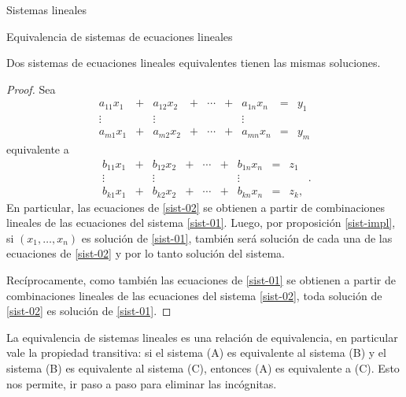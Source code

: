 \begin{chapter}{Sistemas lineales}
\begin{section}{Equivalencia de sistemas de ecuaciones lineales}
            
            \begin{teorema}\label{sistemas-equiv}
                Dos sistemas de ecuaciones lineales equivalentes tienen las mismas soluciones.
            \end{teorema}
            \begin{proof}
                Sea 
                \begin{equation}\label{sist-01} \tag{*}
                \begin{matrix}
                a_{11}x_1& + &a_{12}x_2& + &\cdots& + &a_{1n}x_n &= &y_1\\
                \vdots&  &\vdots& &&  &\vdots \\
                a_{m1}x_1& + &a_{m2}x_2& + &\cdots& + &a_{mn}x_n &=&y_m
                \end{matrix}
                \end{equation}
                equivalente a
                \begin{equation}\label{sist-02} \tag{**}
                \begin{matrix}
                b_{11}x_1& + &b_{12}x_2& + &\cdots& + &b_{1n}x_n &= &z_1\\
                \vdots&  &\vdots& &&  &\vdots \\
                b_{k1}x_1& + &b_{k2}x_2& + &\cdots& + &b_{kn}x_n &=&z_k,
                \end{matrix}.
                \end{equation}
                En particular, las ecuaciones  de \eqref{sist-02} se obtienen a partir de combinaciones  lineales de las ecuaciones del sistema  \eqref{sist-01}. Luego, por proposición \ref{sist-impl}, si  $(x_1,\ldots,x_n)$  es solución de  \eqref{sist-01}, también será solución de cada una de las ecuaciones de \eqref{sist-02} y por lo tanto solución  del sistema. 
                
                Recíprocamente, como también las ecuaciones  de \eqref{sist-01} se obtienen a partir de     combinaciones lineales de las ecuaciones del sistema  \eqref{sist-02}, toda solución  de    \eqref{sist-02} es solución de   \eqref{sist-01}.
            \end{proof}
            

            \begin{observacion*}
                La equivalencia de sistemas lineales es una relación de equivalencia,  en particular  vale la propiedad transitiva: si el sistema (A) es equivalente al sistema (B) y  el sistema (B)  es equivalente al sistema (C),  entonces (A) es equivalente a (C). Esto nos permite, ir paso a paso para eliminar las incógnitas. 
            \end{observacion*} 


\end{section}
\end{chapter}
